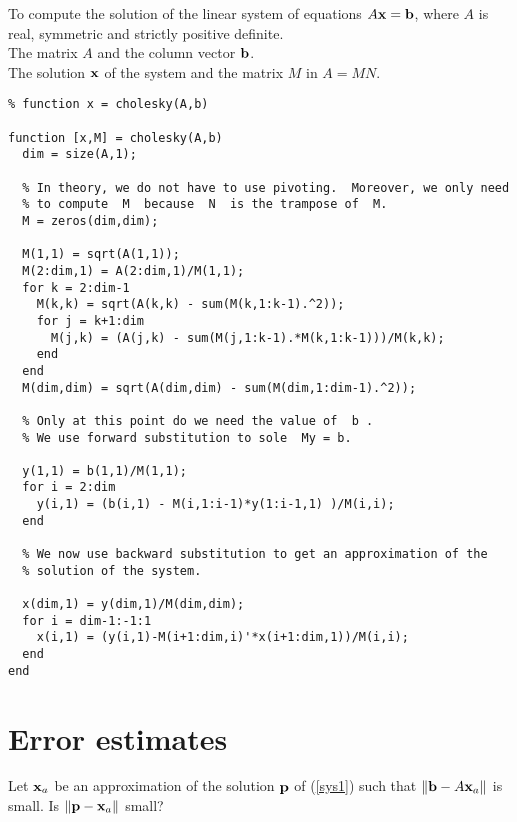\begin{code}
To compute the solution of the linear system of equations
$A\mathbf{x} = \mathbf{b}$, where $A$ is real, symmetric and strictly
positive definite.\\
 The matrix $A$ and the column vector $\mathbf{b}$.\\
 The solution $\mathbf{x}$ of the system and the matrix $M$
in $A = M N$.
\small
\begin{verbatim}
% function x = cholesky(A,b)

function [x,M] = cholesky(A,b)
  dim = size(A,1);

  % In theory, we do not have to use pivoting.  Moreover, we only need
  % to compute  M  because  N  is the trampose of  M.
  M = zeros(dim,dim);
  
  M(1,1) = sqrt(A(1,1));
  M(2:dim,1) = A(2:dim,1)/M(1,1);
  for k = 2:dim-1
    M(k,k) = sqrt(A(k,k) - sum(M(k,1:k-1).^2));
    for j = k+1:dim
      M(j,k) = (A(j,k) - sum(M(j,1:k-1).*M(k,1:k-1)))/M(k,k);
    end
  end
  M(dim,dim) = sqrt(A(dim,dim) - sum(M(dim,1:dim-1).^2));

  % Only at this point do we need the value of  b .
  % We use forward substitution to sole  My = b.

  y(1,1) = b(1,1)/M(1,1);
  for i = 2:dim
    y(i,1) = (b(i,1) - M(i,1:i-1)*y(1:i-1,1) )/M(i,i);
  end

  % We now use backward substitution to get an approximation of the
  % solution of the system.

  x(dim,1) = y(dim,1)/M(dim,dim);
  for i = dim-1:-1:1
    x(i,1) = (y(i,1)-M(i+1:dim,i)'*x(i+1:dim,1))/M(i,i);
  end
end
\end{verbatim}
\end{code}

\section{Error estimates}\label{ErrorEstAxb}

Let $\mathbf{x}_a$ be an approximation of the solution $\mathbf{p}$ of
(\ref{sys1}) such that $\|\mathbf{b} - A\mathbf{x}_a\|$ is small.  Is
$\|\mathbf{p} - \mathbf{x}_a\|$ small?

